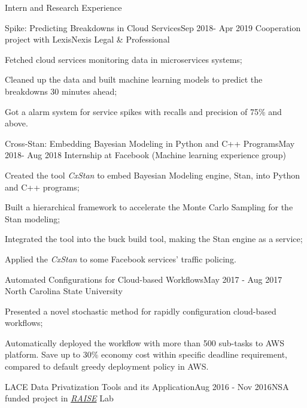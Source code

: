 \documentclass{resume} %
\begin{document}
\begin{rSection}{Intern and Research Experience}
\begin{rSubsection}{Spike: Predicting Breakdowns in Cloud Services}{Sep 2018- Apr 2019}
{Cooperation project with LexisNexis Legal \& Professional}{}
\item Fetched cloud services monitoring data in microservices systems;
\item Cleaned up the data and built machine learning models to predict the breakdowns 30 minutes ahead;
\item Got a alarm system for service spikes with recalls and precision of 75\% and above.
\end{rSubsection}


\begin{rSubsection}{Cross-Stan: Embedding Bayesian Modeling in Python and C++ Programs}{May 2018- Aug 2018}
{Internship at Facebook (Machine learning experience group)}{}
\item Created the tool {\it CxStan} to embed Bayesian Modeling engine, Stan, into Python and C++ programs;
\item Built a hierarchical framework to accelerate the  Monte Carlo Sampling for the Stan modeling;
\item Integrated the tool into the buck build tool, making the Stan engine as a service;
\item Applied the {\it CxStan} to some Facebook services' traffic policing.
\end{rSubsection}

\begin{rSubsection}{Automated Configurations for Cloud-based Workflows}{May 2017 - Aug 2017}
{North Carolina State University}{}
\item Presented a novel stochastic method for rapidly configuration cloud-based workflows;
\item Automatically deployed the workflow with more than 500 sub-tasks to AWS platform. Save up to 30\% economy cost within specific deadline requirement, compared to default greedy deployment policy in AWS.
\end{rSubsection}

\begin{rSubsection}{LACE Data Privatization Tools and its Application}{Aug 2016 - Nov 2016}{NSA funded project in \href{http://ai4se.net/index}{\textit{RAISE}} Lab}{}


\end{rSubsection}
\end{rSection}
\end{document}
